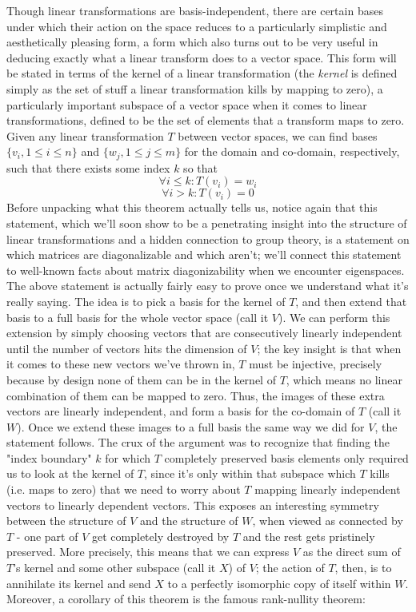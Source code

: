 \documentclass{article}
\newcommand{\nn}{\leavevmode \newline \newline}
\begin{document}
\begin{adjustwidth}{1cm}{1cm}

	Though linear transformations are basis-independent, there are certain bases under which their action on the space reduces to a particularly simplistic and aesthetically pleasing form, a form which also turns out to be very useful in deducing exactly what a linear transform does to a vector space. This form will be stated in terms of the kernel of a linear transformation (the \textit{kernel} is defined simply as the set of stuff a linear transformation kills by mapping to zero), a particularly important subspace of a vector space when it comes to linear transformations, defined to be the set of elements that a transform maps to zero. Given any linear transformation $ T $ between vector spaces, we can find bases $ \{ v_i, 1 \leq i \leq n \} $ and $ \{ w_j, 1 \leq j \leq m \} $ for the domain and co-domain, respectively, such that there exists some index $ k $ so that
		$$ \forall i \leq k: T(v_i) = w_i $$
		$$ \forall i > k: T(v_i) = 0 $$
	Before unpacking what this theorem actually tells us, notice again that this statement, which we'll soon show to be a penetrating insight into the structure of linear transformations and a hidden connection to group theory, is a statement on which matrices are diagonalizable and which aren't; we'll connect this statement to well-known facts about matrix diagonizability when we encounter eigenspaces. The above statement is actually fairly easy to prove once we understand what it's really saying. The idea is to pick a basis for the kernel of $ T $, and then extend that basis to a full basis for the whole vector space (call it $ V $). We can perform this extension by simply choosing vectors that are consecutively linearly independent until the number of vectors hits the dimension of $ V $; the key insight is that when it comes to these new vectors we've thrown in, $ T $ must be injective, precisely because by design none of them can be in the kernel of $ T $, which means no linear combination of them can be mapped to zero. Thus, the images of these extra vectors are linearly independent, and form a basis for the co-domain of $ T $ (call it $ W $). Once we extend these images to a full basis the same way we did for $ V $, the statement follows.
	\nn
	The crux of the argument was to recognize that finding the "index boundary" $ k $ for which $ T $ completely preserved basis elements only required us to look at the kernel of $ T $, since it's only within that subspace which $ T $ kills (i.e. maps to zero) that we need to worry about $ T $ mapping linearly independent vectors to linearly dependent vectors. This exposes an interesting symmetry between the structure of $ V $ and the structure of $ W $, when viewed as connected by $ T $ - one part of $ V $ get completely destroyed by $ T $ and the rest gets pristinely preserved. More precisely, this means that we can express $ V $ as the direct sum of $ T $'s kernel and some other subspace (call it $ X $) of $ V $; the action of $ T $, then, is to annihilate its kernel and send $ X $ to a perfectly isomorphic copy of itself within $ W $. Moreover, a corollary of this theorem is the famous rank-nullity theorem:

\end{adjustwidth}
\end{document}
